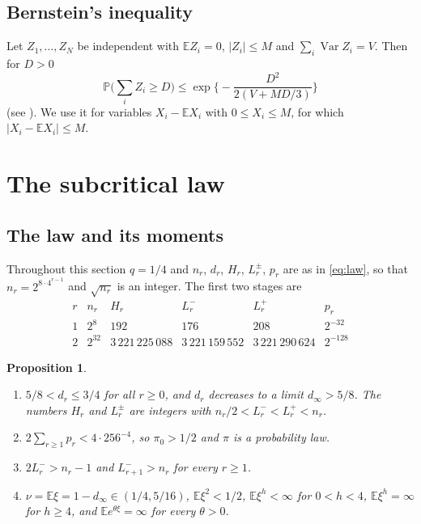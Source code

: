 \documentclass[11pt]{amsart}
\newtheorem{proposition}[theorem]{Proposition}
\theoremstyle{definition}
\newcommand{\E}{\mathbb{E}}
\newcommand{\Prob}{\mathbb{P}}
\DeclareMathOperator{\Var}{Var}
\begin{document}
\subsection{Bernstein's inequality}

Let $Z_1,\dots,Z_N$ be independent with $\E Z_i=0$, $|Z_i|\le M$ and $\sum_i\Var Z_i=V$. Then for $D>0$
\begin{equation}\label{eq:bernstein}
\Prob\Big(\sum_iZ_i\ge D\Big)\le\exp\Big\{-\frac{D^2}{2(V+MD/3)}\Big\}
\end{equation}
(see \cite[Theorem 2.10]{BLM}). We use it for variables $X_i-\E X_i$ with $0\le X_i\le M$, for which $|X_i-\E X_i|\le M$.

\section{The subcritical law}\label{sec:sub}

\subsection{The law and its moments}

Throughout this section $q=1/4$ and $n_r$, $d_r$, $H_r$, $L_r^\pm$, $p_r$ are as in \eqref{eq:law}, so that $n_r=2^{8\cdot4^{r-1}}$ and $\sqrt{n_r}$ is an integer. The first two stages are
\[
\begin{array}{c|c|c|c|c|c}
r & n_r & H_r & L_r^- & L_r^+ & p_r\\ \hline
1 & 2^{8} & 192 & 176 & 208 & 2^{-32}\\
2 & 2^{32} & 3\,221\,225\,088 & 3\,221\,159\,552 & 3\,221\,290\,624 & 2^{-128}
\end{array}
\]

\begin{proposition}\label{prop:law}
\begin{enumerate}
\item[(a)] $5/8<d_r\le3/4$ for all $r\ge0$, and $d_r$ decreases to a limit $d_\infty>5/8$. The numbers $H_r$ and $L_r^\pm$ are integers with $n_r/2<L_r^-<L_r^+<n_r$.
\item[(b)] $2\sum_{r\ge1}p_r<4\cdot256^{-4}$, so $\pi_0>1/2$ and $\pi$ is a probability law.
\item[(c)] $2L_r^->n_r-1$ and $L_{r+1}^->n_r$ for every $r\ge1$.
\item[(d)] $\nu=\E\xi=1-d_\infty\in(1/4,5/16)$, $\E\xi^2<1/2$, $\E\xi^h<\infty$ for $0<h<4$, $\E\xi^h=\infty$ for $h\ge4$, and $\E e^{\theta\xi}=\infty$ for every $\theta>0$.
\end{enumerate}
\end{proposition}
\end{document}
